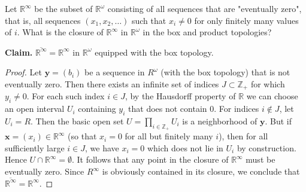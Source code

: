 \documentclass[a4paper,10pt]{article}
\newcommand{\bx}{\mathbf{x}}
\newcommand{\by}{\mathbf{y}}
\newcommand{\ZZ}{\mathbb{Z}}
\newcommand{\RR}{\mathbb{R}}
\begin{document}
\begin{exercise}[ID=2.19.7]
    Let $\mathbb{R}^\infty$ be the subset of $\mathbb{R}^\omega$ consisting of all sequences that are "eventually zero", that is, all sequences $(x_1, x_2, \ldots)$ such that $x_i \neq 0$ for only finitely many values of $i$.
    What is the closure of $\mathbb{R}^\infty$ in $\mathbb{R}^\omega$ in the box and product topologies?
\end{exercise}

\begin{solution}
    {\bf Claim.}  $\overline{\mathbb{R}^\infty} = \mathbb{R}^\infty$ in $\mathbb{R}^\omega$ equipped with the box topology.
    \begin{proof}
        Let $\by = (b_i)$ be a sequence in $R^\omega$ (with the box topology) that is not eventually zero.
        Then there exists an infinite set of indices $J \subset \ZZ_+$ for which $y_i \neq 0$.
        For each such index $i \in J$, by the Hausdorff property of $\RR$ we can choose an open interval $U_i$ containing $y_i$ that does not contain $0$.
        For indices $i \notin J$, let $U_i = R$.
        Then the basic open set $U = \prod_{i\in\ZZ_+} U_i$ is a neighborhood of $\by$.
        But if $\bx = (x_i) \in \RR^\infty$ (so that $x_i = 0$ for all but finitely many $i$), then for all sufficiently large $i \in J$, we have $x_i = 0$ which does not lie in $U_i$ by construction.
        Hence $U \cap \RR^\infty = \emptyset$.
        It follows that any point in the closure of $\RR^\infty$ must be eventually zero.
        Since $R^\infty$ is obviously contained in its closure, we conclude that $\overline{\RR^\infty} = \RR^\infty$.
    \end{proof}
    \bigskip


\end{solution}
\end{document}
